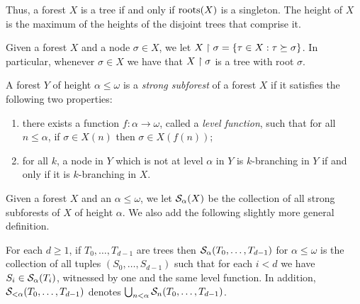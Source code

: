 \noindent Thus, a forest $X$ is a tree if and only if $\operatorname{roots}(X)$ is a singleton. The height of $X$ is the maximum of the heights of the disjoint trees that comprise it.

Given a forest $X$ and a node $\sigma \in X$, we let $X \upharpoonright \sigma = \{ \tau \in X: \tau \succeq \sigma \}$. In particular, whenever $\sigma \in X$ we have that $X \upharpoonright \sigma$ is a tree with root $\sigma$.

\begin{definition}
  A forest $Y$ of height $\alpha \leq \omega$ is a \emph{strong subforest} of a forest $X$ if it satisfies the following two properties:
  \begin{enumerate}
  \item there exists a function $f: \alpha \to \omega$, called a \emph{level function}, such that for all $n \leq \alpha$, if $\sigma \in X(n)$ then $\sigma \in X(f(n))$;
  \item for all $k$, a node in $Y$ which is not at level $\alpha$ in $Y$ is $k$-branching in $Y$ if and only if it is $k$-branching in $X$.
  \end{enumerate}
\end{definition}

\noindent Given a forest $X$ and an $\alpha \leq \omega$, we let $\mathcal{S}_{\alpha}({X})$ be the collection of all strong subforests of $X$ of height $\alpha$. We also add the following slightly more general definition.

\begin{definition}
	For each $d \geq 1$, if $T_0,\ldots,T_{d-1}$ are trees then $\mathcal{S}_{\alpha}({T_0,\dots, T_{d-1}})$ for $\alpha \leq \omega$ is the collection of all tuples $(S_0,\ldots,S_{d-1})$ such that for each $i < d$ we have $S_i \in \mathcal{S}_{\alpha}({T_i})$, witnessed by one and the same level function. In addition, $\mathcal{S}_{<\alpha}({T_0,\dots, T_{d-1}})$\index{$\Subtree{<\alpha}{}$} denotes $\bigcup_{n < \alpha} \mathcal{S}_{n}({T_0,\dots, T_{d-1}})$.
\end{definition}

